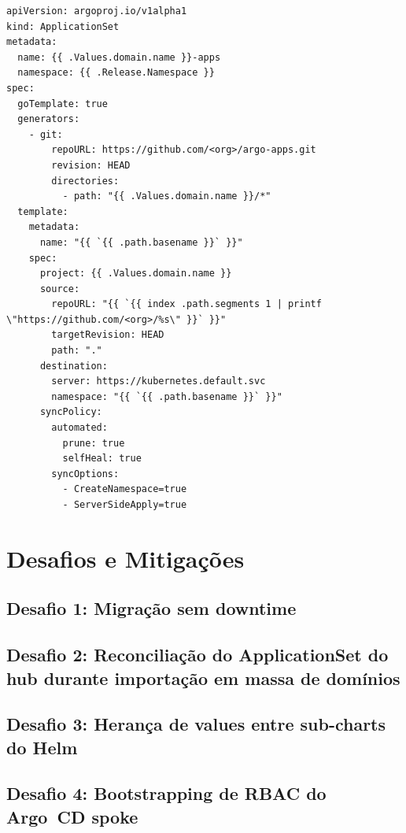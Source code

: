 \documentclass[11pt,a4paper]{article}
\begin{document}
\begin{lstlisting}[style=yaml,
  caption={Template do ApplicationSet do spoke dentro do sub-chart argocd-spoke},
  label={lst:spoke-appset}]
apiVersion: argoproj.io/v1alpha1
kind: ApplicationSet
metadata:
  name: {{ .Values.domain.name }}-apps
  namespace: {{ .Release.Namespace }}
spec:
  goTemplate: true
  generators:
    - git:
        repoURL: https://github.com/<org>/argo-apps.git
        revision: HEAD
        directories:
          - path: "{{ .Values.domain.name }}/*"
  template:
    metadata:
      name: "{{ `{{ .path.basename }}` }}"
    spec:
      project: {{ .Values.domain.name }}
      source:
        repoURL: "{{ `{{ index .path.segments 1 | printf \"https://github.com/<org>/%s\" }}` }}"
        targetRevision: HEAD
        path: "."
      destination:
        server: https://kubernetes.default.svc
        namespace: "{{ `{{ .path.basename }}` }}"
      syncPolicy:
        automated:
          prune: true
          selfHeal: true
        syncOptions:
          - CreateNamespace=true
          - ServerSideApply=true
\end{lstlisting}

\section{Desafios e Mitigações}
\label{sec:challenges}

\subsection{Desafio 1: Migração sem downtime}

\subsection{Desafio 2: Reconciliação do ApplicationSet do hub durante importação em massa de domínios}

\subsection{Desafio 3: Herança de values entre sub-charts do Helm}

\subsection{Desafio 4: Bootstrapping de RBAC do Argo~CD spoke}

\end{document}
